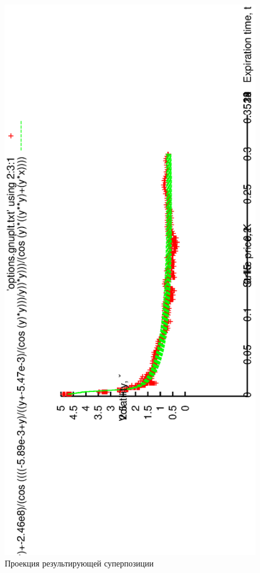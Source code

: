 \documentclass[12pt,a4paper]{amsart}
\begin{document}
\begin{figure}[h]
  \includegraphics[scale=0.80,angle=-90]{figs/HolSh-proj.eps}
  \caption{Проекция результирующей суперпозиции}
  \label{fig:2_proj}
\end{figure}
\end{document}
